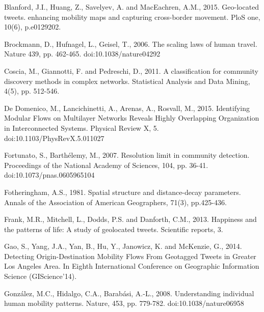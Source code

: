 \documentclass[]{tGIS2e}
\begin{document}
{\begin{thebibliography}{9}

Blanford, J.I., Huang, Z., Savelyev, A. and MacEachren, A.M., 2015. Geo-located tweets. enhancing mobility maps and capturing cross-border movement. PloS one, 10(6), p.e0129202.

Brockmann, D., Hufnagel, L., Geisel, T., 2006. The scaling laws of human travel. Nature 439, pp. 462-465. doi:10.1038/nature04292

Coscia, M., Giannotti, F. and Pedreschi, D., 2011. A classification for community discovery methods in complex networks. Statistical Analysis and Data Mining, 4(5), pp. 512-546.

De Domenico, M., Lancichinetti, A., Arenas, A., Rosvall, M., 2015. Identifying Modular Flows on Multilayer Networks Reveals Highly Overlapping Organization in Interconnected Systems. Physical Review X, 5. doi:10.1103/PhysRevX.5.011027

Fortunato, S., Barthélemy, M., 2007. Resolution limit in community detection. Proceedings of the National Academy of Sciences, 104, pp. 36-41. doi:10.1073/pnas.0605965104

Fotheringham, A.S., 1981. Spatial structure and distance-decay parameters. Annals of the Association of American Geographers, 71(3), pp.425-436.

Frank, M.R., Mitchell, L., Dodds, P.S. and Danforth, C.M., 2013. Happiness and the patterns of life: A study of geolocated tweets. Scientific reports, 3.

Gao, S., Yang, J.A., Yan, B., Hu, Y., Janowicz, K. and McKenzie, G., 2014. Detecting Origin-Destination Mobility Flows From Geotagged Tweets in Greater Los Angeles Area. In Eighth International Conference on Geographic Information Science (GIScience'14).

González, M.C., Hidalgo, C.A., Barabási, A.-L., 2008. Understanding individual human mobility patterns. Nature, 453, pp. 779-782. doi:10.1038/nature06958


\end{thebibliography}}
\end{document}

